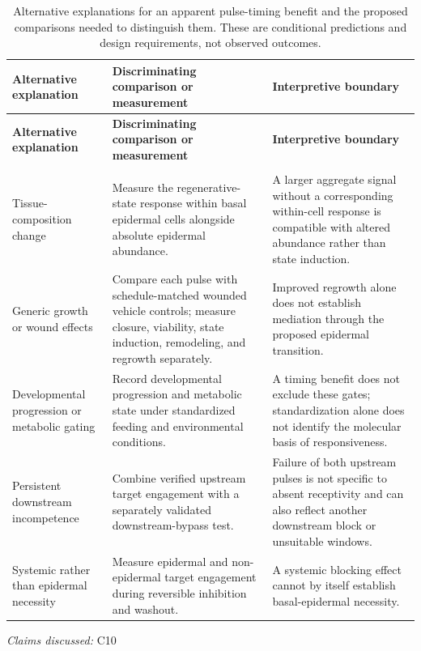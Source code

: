 \documentclass[11pt]{article}
\begin{document}
\begin{longtable}{@{}>{\raggedright\arraybackslash}p{}>{\raggedright\arraybackslash}p{}>{\raggedright\arraybackslash}p{}@{}}
\caption{Alternative explanations for an apparent pulse-timing benefit and the proposed comparisons needed to distinguish them. These are conditional predictions and design requirements, not observed outcomes.}\\
\toprule
\textbf{Alternative explanation} & \textbf{Discriminating comparison or measurement} & \textbf{Interpretive boundary}\\
\midrule
\endfirsthead
\toprule
\textbf{Alternative explanation} & \textbf{Discriminating comparison or measurement} & \textbf{Interpretive boundary}\\
\midrule
\endhead
\midrule
\multicolumn{3}{r}{\footnotesize Continued on next page}\\
\endfoot
\bottomrule
\endlastfoot
Tissue-composition change & Measure the regenerative-state response within basal epidermal cells alongside absolute epidermal abundance. & A larger aggregate signal without a corresponding within-cell response is compatible with altered abundance rather than state induction.\\
Generic growth or wound effects & Compare each pulse with schedule-matched wounded vehicle controls; measure closure, viability, state induction, remodeling, and regrowth separately. & Improved regrowth alone does not establish mediation through the proposed epidermal transition.\\
Developmental progression or metabolic gating & Record developmental progression and metabolic state under standardized feeding and environmental conditions. & A timing benefit does not exclude these gates; standardization alone does not identify the molecular basis of responsiveness.\\
Persistent downstream incompetence & Combine verified upstream target engagement with a separately validated downstream-bypass test. & Failure of both upstream pulses is not specific to absent receptivity and can also reflect another downstream block or unsuitable windows.\\
Systemic rather than epidermal necessity & Measure epidermal and non-epidermal target engagement during reversible inhibition and washout. & A systemic blocking effect cannot by itself establish basal-epidermal necessity.\\
\end{longtable}
\par{}
\textit{Claims discussed: }C10
\end{document}

